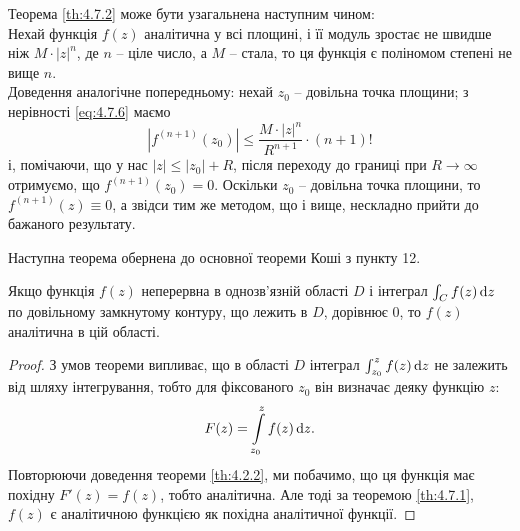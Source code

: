 \begin{remark*}
	Теорема \ref{th:4.7.2} може бути узагальнена наступним чином: \\

	Нехай функція $f(z)$ аналітична у всі площині, і її модуль зростає не швидше ніж $M\cdot|z|^n$, де $n$ -- ціле число, а $M$ -- стала, то ця функція є поліномом степені не вище $n$. \\

	Доведення аналогічне попередньому: нехай $z_0$ -- довільна точка площини; з нерівності \eqref{eq:4.7.6} маємо
	\begin{equation}
		\label{eq:4.7.9}
		\left| f^{(n + 1)}(z_0) \right| \le \frac{M \cdot |z|^n}{R^{n + 1}} \cdot (n + 1)!
	\end{equation}
	і, помічаючи, що у нас $|z| \le |z_0| + R$, після переходу до границі при $R \to \infty$ отримуємо, що $f^{(n + 1)}(z_0) = 0$. Оскільки $z_0$ -- довільна точка площини, то $f^{(n + 1)}(z) \equiv 0$, а звідси тим же методом, що і вище, нескладно прийти до бажаного результату.
\end{remark*}
Наступна теорема обернена до основної теореми Коші з пункту 12.

\begin{theorem}[Г. Морера, 1886 р.]
	\label{th:4.7.3}
	Якщо функція $f(z)$ неперервна в однозв'язній області $D$ і інтеграл $\int_C f(z) \mathop{}\!\mathrm{d} z$ по довільному замкнутому контуру, що лежить в $D$, дорівнює 0, то $f(z)$ аналітична в цій області.
\end{theorem}

\begin{proof}
З умов теореми випливає, що в області $D$ інтеграл $\int_{z_0}^z f(z) \mathop{}\!\mathrm{d} z$ не залежить від шляху інтегрування, тобто для фіксованого $z_0$ він визначає деяку функцію $z$:
\begin{equation}
	\label{eq:4.7.10}
	F(z) = \displaystyle\int\limits_{z_0}^z f(z) \mathop{}\!\mathrm{d} z.
\end{equation}
Повторюючи доведення теореми \ref{th:4.2.2}, ми побачимо, що ця функція має похідну $F'(z) = f(z)$, тобто аналітична. Але тоді за теоремою \ref{th:4.7.1}, $f(z)$ є аналітичною функцією як похідна аналітичної функції.
\end{proof}


% 
